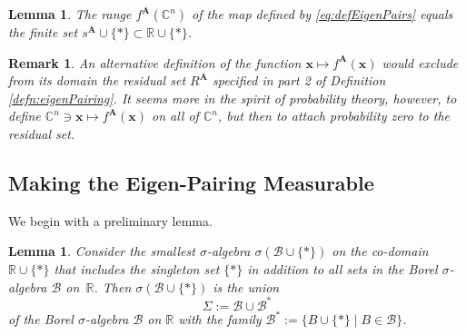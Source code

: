 \documentclass[11pt]{article}
\newcommand \R { \mathbb{R} }
\newcommand \C { \mathbb{C} }
\newtheorem{lemma}[theorem]{Lemma}
\newtheorem{remark}[theorem]{Remark}
\begin{document}
\begin{lemma} \label{lem:range}
	The range $ f^{ \mathbf A} ( \C^n )$ 
		of the map defined by \eqref{eq:defEigenPairs} equals 
		the finite set $ s^{ \mathbf A} \cup \{ * \} \subset \R \cup \{ * \}$.
\end{lemma}

\begin{remark}
	An alternative definition of the function $ \mathbf x \mapsto f^{ \mathbf A} ( \mathbf x) $
	would exclude from its domain the residual set $ R^{ \mathbf A} $ specified 
	in part 2 of Definition \ref{defn:eigenPairing}.
	It seems more in the spirit of probability theory, however, 
	to define $ \C^n \owns \mathbf x \mapsto f^{ \mathbf A} ( \mathbf x) $ on all of $ \C^n $, 
	but then to attach probability zero to the residual set.
\end{remark}

\subsection{Making the Eigen-Pairing Measurable}

We begin with a preliminary lemma.

\begin{lemma}
	Consider the smallest $ \sigma $-algebra $ \sigma ( \mathcal B \cup \{*\} )$ 
	on the co-domain $ \R \cup \{*\} $ that includes the singleton set $ \{*\} $
	in addition to all sets in the Borel $ \sigma $-algebra $ \mathcal B$ on~$ \R $.
	Then $ \sigma ( \mathcal B \cup \{*\} )$ is the union
\begin{equation} \label{eq:defSigma}
	\Sigma := \mathcal B \cup \mathcal B^*
\end{equation}
	of the Borel $ \sigma $-algebra $ \mathcal B$ on $\R$ 
	with the family $ \mathcal B^* := \{ B \cup \{*\} \mid B \in \mathcal B \} $. 
\end{lemma}
\end{document}
